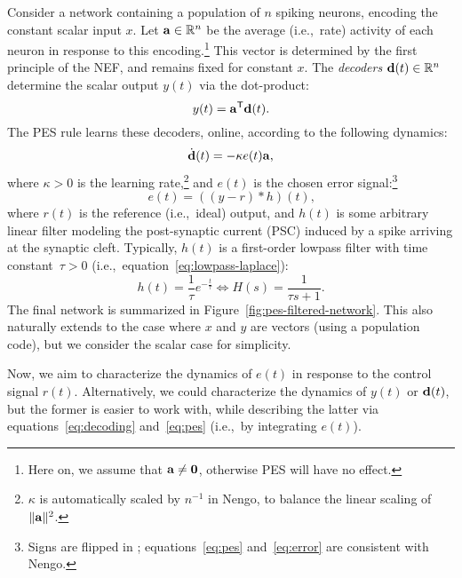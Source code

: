 Consider a network containing a population of $n$ spiking neurons, encoding the constant scalar input $x$.
Let $\mathbf{a} \in \mathbb{R}^n$ be the average (i.e.,~rate) activity of each neuron in response to this encoding.\footnote{Here on, we assume that $\mathbf{a} \ne \mathbf{0}$, otherwise PES will have no effect.}
This vector is determined by the first principle of the NEF, and remains fixed for constant $x$.
The \emph{decoders} $\mathbf{d}(t) \in \mathbb{R}^n$ determine the scalar output $y(t)$ via the dot-product:
\begin{equation}
\label{eq:decoding}
y(t) = {\mathbf{a}}^\mathsf{T} \mathbf{d}(t)  \text{.}
\end{equation}
The PES rule learns these decoders, online, according to the following dynamics:
\begin{equation}
\label{eq:pes}
\dot{\mathbf{d}}(t) = -\kappa e(t) \mathbf{a} \text{,}
\end{equation}
where $\kappa > 0$ is the learning rate,\footnote{$\kappa$ is automatically scaled by $n^{-1}$ in Nengo, to balance the linear scaling of $\|\mathbf{a}\|^2$.} and $e(t)$ is the chosen error signal:\footnote{Signs are flipped in \citet{voelker2015}; equations~\ref{eq:pes} and~\ref{eq:error} are consistent with Nengo.}
\begin{equation}
\label{eq:error}
e(t) = \left((y - r) \ast h \right)(t) \text{,}
\end{equation}
where $r(t)$ is the reference (i.e.,~ideal) output, and $h(t)$ is some arbitrary linear filter modeling the post-synaptic current (PSC) induced by a spike arriving at the synaptic cleft.
Typically, $h(t)$ is a first-order lowpass filter with time constant~$\tau > 0$ (i.e.,~equation~\ref{eq:lowpass-laplace}):
\begin{equation}
\label{eq:lowpass}
h(t) = \frac{1}{\tau} e^{-\frac{t}{\tau}} \iff H(s) = \frac{1}{\tau s + 1} \text{.}
\end{equation}
The final network is summarized in Figure~\ref{fig:pes-filtered-network}.
This also naturally extends to the case where $x$ and $y$ are vectors (using a population code), but we consider the scalar case for simplicity. 

Now, we aim to characterize the dynamics of $e(t)$ in response to the control signal $r(t)$.
Alternatively, we could characterize the dynamics of $y(t)$ or $\mathbf{d}(t)$, but the former is easier to work with, while describing the latter via equations~\ref{eq:decoding} and~\ref{eq:pes} (i.e.,~by integrating $e(t)$).

